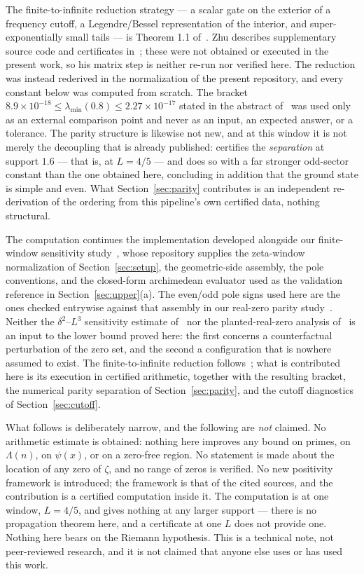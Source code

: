 \documentclass[11pt,a4paper]{article}
\theoremstyle{definition}
\theoremstyle{remark}
\begin{document}
The finite-to-infinite reduction strategy --- a scalar gate on the exterior of a
frequency cutoff, a Legendre/Bessel representation of the interior, and
super-exponentially small tails --- is Theorem 1.1 of~\cite{Zhu}. Zhu describes
supplementary source code and certificates in~\cite[\S17]{Zhu}; these were not
obtained or executed in the present work, so his matrix step is neither re-run
nor verified here. The reduction was instead rederived in the normalization of
the present repository, and every constant below was computed from scratch. The bracket $8.9\times10^{-18} \le \lambda_{\min}(0.8) \le
2.27\times10^{-17}$ stated in the abstract of~\cite{Zhu} was used only as an
external comparison point and never as an input, an expected answer, or a
tolerance. The parity structure is likewise not new, and at this window it is
not merely the decoupling that is already published: \cite[Thm.~6.2]{Zhu}
certifies the \emph{separation} at support $1.6$ --- that is, at $L = 4/5$ --- and
does so with a far stronger odd-sector constant than the one obtained here,
concluding in addition that the ground state is simple and even. What
Section~\ref{sec:parity} contributes is an independent re-derivation of the
ordering from this pipeline's own certified data, nothing structural.

The computation continues the implementation developed alongside our
finite-window sensitivity study~\cite{Sensitivity}, whose repository supplies the
zeta-window normalization of Section~\ref{sec:setup}, the geometric-side
assembly, the pole conventions, and the closed-form archimedean evaluator used
as the validation reference in Section~\ref{sec:upper}(a). The even/odd pole
signs used here are the ones checked entrywise against that assembly in our
real-zero parity study~\cite{ParityNote}. Neither the $\delta^2$--$L^3$
sensitivity estimate of~\cite{Sensitivity} nor the planted-real-zero analysis
of~\cite{ParityNote} is an input to the lower bound proved here: the first
concerns a counterfactual perturbation of the zero set, and the second a
configuration that is nowhere assumed to exist. The finite-to-infinite reduction
follows~\cite{Zhu}; what is contributed here is its execution in certified
arithmetic, together with the resulting bracket, the numerical parity separation
of Section~\ref{sec:parity}, and the cutoff diagnostics of
Section~\ref{sec:cutoff}.

What follows is deliberately narrow, and the following are \emph{not} claimed.
No arithmetic estimate is obtained: nothing here improves any bound on primes,
on $\Lambda(n)$, on $\psi(x)$, or on a zero-free region. No statement is made
about the location of any zero of $\zeta$, and no range of zeros is verified.
No new positivity framework is introduced; the framework is that of the cited
sources, and the contribution is a certified computation inside it. The
computation is at one window, $L = 4/5$, and gives nothing at any larger support
--- there is no propagation theorem here, and a certificate at one $L$ does not
provide one. Nothing here bears on the Riemann hypothesis. This is a technical
note, not peer-reviewed research, and it is not claimed that anyone else uses or
has used this work.
\end{document}
